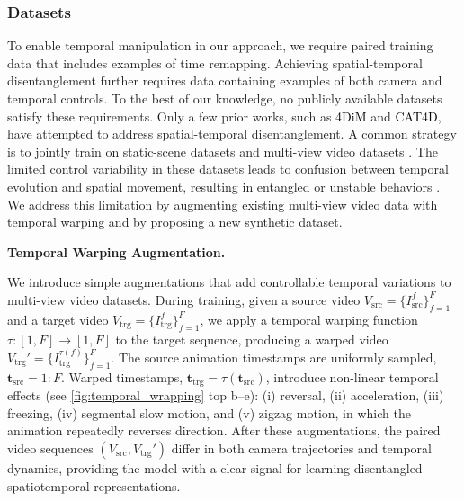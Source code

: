 \documentclass[10pt,twocolumn,letterpaper]{article}
\newcommand{\myparagraph}[1]{%
  \vspace{-0.05em}%
  \par\addvspace{0.4em}%
  \noindent\textbf{#1}\hspace{0.4em}%
}
\newcommand{\nameCOLOR}[1]{\textcolor{black}{#1}}
\newcommand{\fourdim}{\nameCOLOR{\mbox{4DiM}}\xspace}
\newcommand{\catfourd}{\nameCOLOR{\mbox{CAT4D}}\xspace}
\newcommand{\src}{\text{src}}
\newcommand{\trg}{\text{trg}}
\newcommand{\sourcevideo}{V_{\src}}
\newcommand{\targetvideo}{V_{\trg}}
\newcommand{\animatime}{\mathbf{t}}
\newcommand{\numf}{F}
\begin{document}
\subsubsection{Datasets}
\label{sec:datasets}
To enable temporal manipulation in our approach, we require paired training data that includes examples of time remapping. 
Achieving spatial-temporal disentanglement further requires data containing examples of both camera and temporal controls. 
To the best of our knowledge, no publicly available datasets satisfy these requirements.
Only a few prior works, such as \fourdim \cite{watson2025controllingspacetimediffusion} and \catfourd \cite{Wu2024}, have attempted to address spatial-temporal disentanglement. 
A common strategy is to jointly train on static-scene datasets and multi-view video datasets \cite{zhou2018stereo,ling2024dl3dv}. 
The limited control variability in these datasets leads to confusion between temporal evolution and spatial movement, resulting in entangled or unstable behaviors \cite{watson2025controllingspacetimediffusion,Wu2024}. 
We address this limitation by augmenting existing multi-view video data with temporal warping and by proposing a new synthetic dataset.


\myparagraph{Temporal Warping Augmentation.}
We introduce simple augmentations that add controllable temporal variations to multi-view video datasets.
During training, given a source video $\sourcevideo = \{I_\src^f\}_{f=1}^{F}$ and a target video $\targetvideo = \{I_\trg^f\}_{f=1}^{F}$, we apply a temporal warping function $\tau: [1, \numf] \rightarrow [1, \numf]$ to the target sequence, producing a warped video $V_\trg' = \{I_\trg^{\tau(f)}\}_{f=1}^{F}$. 
The source animation timestamps are uniformly sampled, $\animatime_\src = 1:F$. 
Warped timestamps, $\animatime_\trg = \tau(\animatime_\src)$, introduce non-linear temporal effects (see \cref{fig:temporal_wrapping} top b–e): (i) reversal, (ii) acceleration, (iii) freezing, (iv) segmental slow motion, and (v) zigzag motion, in which the animation repeatedly reverses direction.
After these augmentations, the paired video sequences $(V_\src, V_\trg')$ differ in both camera trajectories and temporal dynamics, providing the model with a clear signal for learning disentangled spatiotemporal representations.
\end{document}
